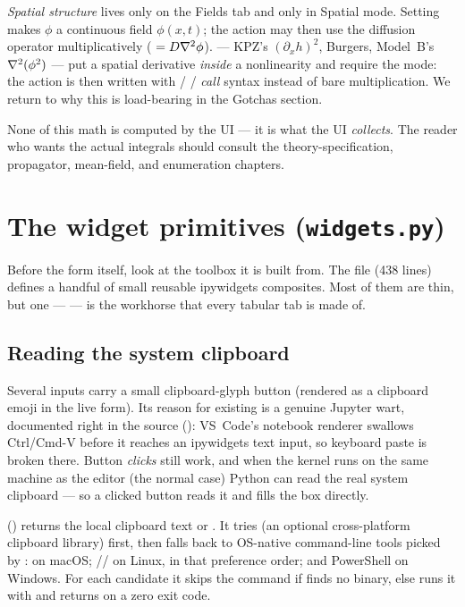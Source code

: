 \begin{note}
\emph{Spatial structure} lives only on the Fields tab and only in Spatial mode.
Setting  makes $\phi$ a continuous field $\phi(x,t)$; the
action may then use the diffusion operator  multiplicatively
( $= D\nabla^2\phi$).  --- KPZ's
$(\partial_x h)^{2}$, Burgers, Model~B's $\nabla^2(\phi^{2})$ --- put a spatial
derivative \emph{inside} a nonlinearity and require the  mode:
the action is then written with  /  / 
\emph{call} syntax instead of bare multiplication. We return to why this is
load-bearing in the Gotchas section.
\end{note}

None of this math is computed by the UI --- it is what the UI \emph{collects}. The
reader who wants the actual integrals should consult the theory-specification,
propagator, mean-field, and enumeration chapters.

\section{The widget primitives (\texttt{widgets.py})}

Before the form itself, look at the toolbox it is built from. The file
 (438 lines) defines a handful of small reusable
ipywidgets composites. Most of them are thin, but one ---  ---
is the workhorse that every tabular tab is made of.

\subsection{Reading the system clipboard}

Several inputs carry a small clipboard-glyph button (rendered as a clipboard
emoji in the live form). Its reason for existing is a
genuine Jupyter wart, documented right in the source
(): VS~Code's notebook renderer swallows
Ctrl/Cmd-V before it reaches an ipywidgets text input, so keyboard paste is broken
there. Button \emph{clicks} still work, and when the kernel runs on the same
machine as the editor (the normal case) Python can read the real system clipboard
--- so a clicked button reads it and fills the box directly.

 () returns the
local clipboard text or . It tries  (an optional
cross-platform clipboard library) first, then falls back to OS-native command-line
tools picked by :  on macOS;
// on Linux, in that preference order; and
PowerShell  on Windows. For each candidate it skips the
command if  finds no binary, else runs it with
 and returns
 on a zero exit code.

